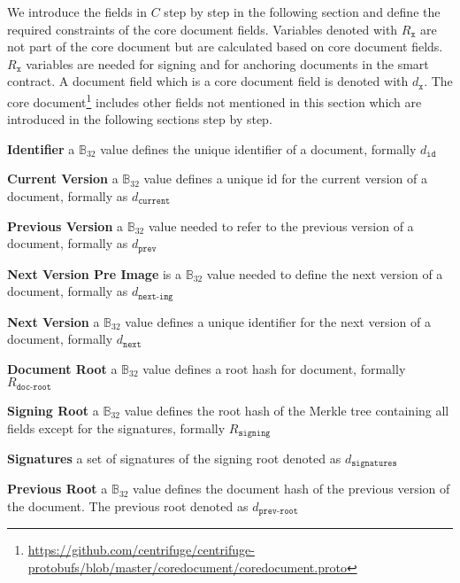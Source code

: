 We introduce the fields in $C$ step by step in the following section and define the required constraints of the core document fields. Variables denoted with $R_{\texttt{x}}$  are not part of the core document but are calculated based on core document fields. $R_{\texttt{x}}$ variables are needed for signing and for anchoring documents in the smart contract. A document field which is a core document field is denoted with $d_{\texttt{x}}$. 
The core document\footnote{\url{https://github.com/centrifuge/centrifuge-protobufs/blob/master/coredocument/coredocument.proto}} includes other fields not mentioned in this section which are introduced in the following sections step by step.
\begin{description} 
\item{\textbf{Identifier}} a $\mathbb{B}_{32}$ value defines the unique identifier of a document, formally $d_{\texttt{id}}$ 
\item{\textbf{Current Version}} a $\mathbb{B}_{32}$ value defines a unique id for the current version of a document, formally as $d_{\texttt{current}}$
\item{\textbf{Previous Version}} a $\mathbb{B}_{32}$ value needed to refer to the previous version of a document, formally as $d_{\texttt{prev}}$
\item{\textbf{Next Version Pre Image}} is a $\mathbb{B}_{32}$ value needed to define the next version of a document,  formally as $d_{\texttt{next-img}}$
\item{\textbf{Next Version}} a $\mathbb{B}_{32}$ value defines a unique identifier for the next version of a document, formally $d_{\texttt{next}}$
\item{\textbf{Document Root}} a $\mathbb{B}_{32}$ value defines a root hash for document, formally $R_{\texttt{doc-root}}$
\item{\textbf{Signing Root}} a $\mathbb{B}_{32}$ value defines the root hash of the Merkle tree containing all fields except for the signatures, formally $R_{\texttt{signing}}$
\item{\textbf{Signatures}} a set of signatures of the signing root denoted as $d_{\texttt{signatures}}$
\item{\textbf{Previous Root}} a $\mathbb{B}_{32}$ value defines the document hash of the previous version of the document. The previous root denoted as $d_{\texttt{prev-root}}$
\end{description}

